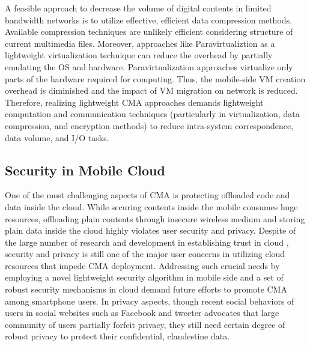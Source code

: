 \documentclass[publish]{IEEEtran}
\begin{document}
A feasible approach to decrease the volume of digital contents \textemdash in limited bandwidth networks \textemdash is to utilize effective, efficient data compression methods. Available compression techniques are unlikely efficient considering structure of current multimedia files. Moreover, approaches like Paravirtualiztion \cite{Youseff2006} as a lightweight virtualization technique can reduce the overhead by partially emulating the OS and hardware. Paravirtualization approaches virtualize only parts of the hardware required for computing. Thus, the mobile-side VM creation overhead is diminished and the impact of VM migration on network is reduced. Therefore, realizing lightweight CMA approaches demands lightweight computation and communication techniques (particularly in virtualization, data compression, and encryption methods) to reduce intra-system correspondence, data volume, and I/O tasks.

\subsection{Security in Mobile Cloud}
One of the most challenging aspects of CMA is protecting offloaded code and data inside the cloud. While securing contents inside the mobile consumes huge resources, offloading plain contents through insecure wireless medium and storing plain data inside the cloud highly violates user security and privacy. Despite of the large number of research and development in establishing trust in cloud  \cite{Wang2009f,Wang2009g,mowbray2009client,Ruj2011}, security and privacy is still one of the major user concerns in utilizing cloud resources that impede CMA deployment. Addressing such crucial needs by employing a novel lightweight security algorithm in mobile side and a set of robust security mechanisms in cloud demand future efforts to promote CMA among smartphone users.
In privacy aspects, though recent social behaviors of users in social websites such as Facebook and tweeter advocates that large community of users partially forfeit privacy, they still need certain degree of robust privacy to protect their confidential, clandestine data.
\end{document}
